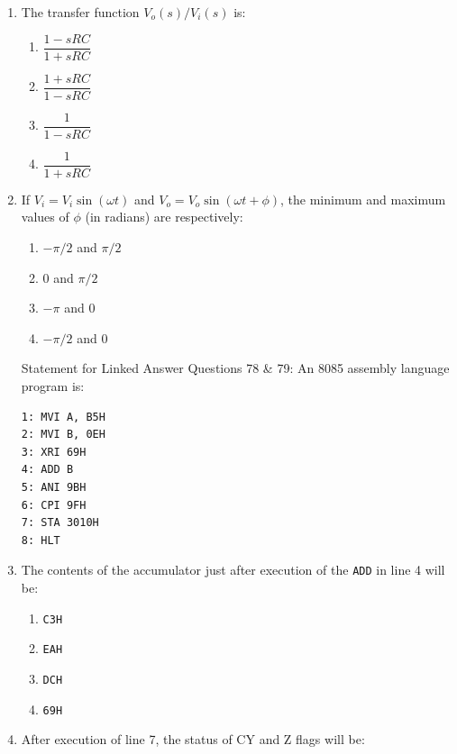\documentclass[journal,12pt,onecolumn]{IEEEtran}
\theoremstyle{remark}
\begin{document}
\begin{enumerate}
\item The transfer function $V_o(s)/V_i(s)$ is:
\hfill{}
\begin{multicols}{4}
\begin{enumerate}
  \item $\dfrac{1-sRC}{1+sRC}$
  \item $\dfrac{1+sRC}{1-sRC}$
  \item $\dfrac{1}{1-sRC}$
  \item $\dfrac{1}{1+sRC}$
\end{enumerate}
\end{multicols}

\item If $V_i = V_i \sin(\omega t)$ and $V_o = V_o \sin(\omega t + \phi)$, the minimum and maximum values of $\phi$ (in radians) are respectively:
\hfill{}
\begin{multicols}{4}
\begin{enumerate}
  \item $-\pi/2$ and $\pi/2$
  \item $0$ and $\pi/2$
  \item $-\pi$ and $0$
  \item $-\pi/2$ and $0$
\end{enumerate}
\end{multicols}

Statement for Linked Answer Questions 78 \& 79: An 8085 assembly language program is: 

\begin{verbatim}
1: MVI A, B5H
2: MVI B, 0EH
3: XRI 69H
4: ADD B
5: ANI 9BH
6: CPI 9FH
7: STA 3010H
8: HLT
\end{verbatim}


\item The contents of the accumulator just after execution of the \texttt{ADD} in line 4 will be:
\hfill{}

\begin{multicols}{4}
\begin{enumerate}
  \item \texttt{C3H}
  \item \texttt{EAH}
  \item \texttt{DCH}
  \item \texttt{69H}
\end{enumerate}
\end{multicols}


\item After execution of line 7, the status of CY and Z flags will be:
\hfill{}


\end{enumerate}
\end{document}
